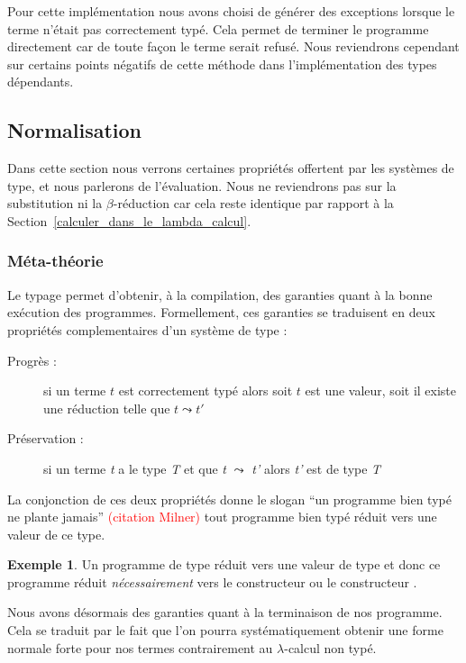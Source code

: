 \documentclass {article}
\theoremstyle{definition}
\newtheorem{example}{Exemple}
\theoremstyle{remark}
\newcommand{\todo}[1]{\textcolor{red}{#1}}
\begin{document}
Pour cette implémentation nous avons choisi de générer des exceptions lorsque le terme
n'était pas correctement typé. Cela permet de terminer le programme directement car de toute
façon le terme serait refusé. Nous reviendrons cependant sur certains points négatifs de cette
méthode dans l'implémentation des types dépendants.



\subsection{Normalisation} %

Dans cette section nous verrons certaines propriétés offertent par les systèmes de type, et nous parlerons 
de l'évaluation. Nous ne reviendrons pas sur la substitution ni la $\beta$-réduction car cela reste identique par 
rapport à la Section~\ref{calculer_dans_le_lambda_calcul}.

\subsubsection{Méta-théorie}

Le typage permet d'obtenir, à la compilation, des garanties quant à la
bonne exécution des programmes.  Formellement, ces garanties se traduisent en deux propriétés complementaires d'un système de type :
\begin{description}
\item[Progrès :] si un terme \(t\) est correctement typé alors soit \(t\) est une valeur, soit il
 existe une réduction telle que \(t \leadsto t'\)
\item[Préservation :] si un terme \emph{t} a le type \emph{T}
et que \emph{t} $\leadsto$ \emph{t'} alors \emph{t'} est de type \emph{T}
\end{description}

La conjonction de ces deux propriétés donne le slogan ``un programme
bien typé ne plante jamais'' \todo{(citation Milner)} tout programme
bien typé réduit vers une valeur de ce type.

\begin{example}
  Un programme de type \bool{} réduit vers une valeur de type \bool{}
  et donc ce programme réduit \emph{nécessairement} vers le
  constructeur \true{} ou le constructeur \false{}.
\end{example}

Nous avons désormais des garanties quant à la terminaison de nos programme.
Cela se traduit par le fait que l'on pourra systématiquement obtenir une 
forme normale forte pour nos termes contrairement au \(\lambda\)-calcul non typé.
\end{document}
